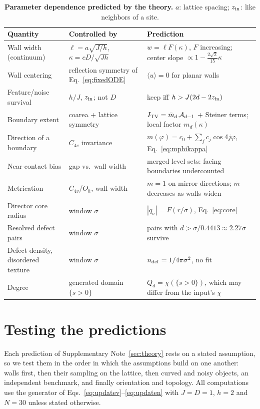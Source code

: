 \documentclass[11pt,a4paper]{article}
\begin{document}
\begin{table}[t]
\centering\caption{\textbf{Parameter dependence predicted by the theory.} $a$: lattice spacing; $z_{\rm in}$: like neighbors of a site.}\label{tab:depend}
\small\begin{tabularx}{\linewidth}{@{}p{.3\linewidth}p{.27\linewidth}X@{}}\toprule
Quantity & Controlled by & Prediction\\\midrule
Wall width (continuum) & $\ell=a\sqrt{J/h}$, $\kappa=cD/\sqrt{Jh}$ & $w=\ell F(\kappa)$, $F$ increasing; center slope $\propto1-\tfrac{2\sqrt2}{15}\kappa$\\
Wall centering & reflection symmetry of Eq.~\eqref{eq:fixedODE} & $\langle u\rangle=0$ for planar walls\\
Feature/noise survival & $h/J$, $z_{\rm in}$; not $D$ & keep iff $h>J(2d-2z_{\rm in})$\\
Boundary extent & coarea + lattice symmetry & $I_{\rm TV}=\bar m_d\,\mathcal A_{d-1}$ + Steiner terms; local factor $m_d(\kappa)$\\
Direction of a boundary & $C_{4v}$ invariance & $m(\varphi)=c_0+\sum_j c_j\cos4j\varphi$, Eq.~\eqref{eq:mphikappa}\\
Near-contact bias & gap vs.\ wall width & merged level sets: facing boundaries undercounted\\
Metrication & $C_{4v}$/$O_h$, wall width & $m=1$ on mirror directions; $\bar m$ decreases as walls widen\\
Director core radius & window $\sigma$ & $|q_\sigma|=F(r/\sigma)$, Eq.~\eqref{eq:core}\\
Resolved defect pairs & window $\sigma$ & pairs with $d>\sigma/0.4413\approx2.27\sigma$ survive\\
Defect density, disordered texture & window $\sigma$ & $n_{\rm def}=1/4\pi\sigma^2$, no fit\\
Degree & generated domain $\{s>0\}$ & $Q_d=\chi(\{s>0\})$, which may differ from the input's $\chi$\\\bottomrule
\end{tabularx}
\end{table}

\FloatBarrier
\section{Testing the predictions}\label{sec:results}
Each prediction of Supplementary Note~\ref{sec:theory} rests on a stated assumption, so we test them in the order in which the assumptions build on one another: walls first, then their sampling on the lattice, then curved and noisy objects, an independent benchmark, and finally orientation and topology. All computations use the generator of Eqs.~\eqref{eq:updatev}--\eqref{eq:updaten} with $J=D=1$, $h=2$ and $N=30$ unless stated otherwise.
\end{document}
